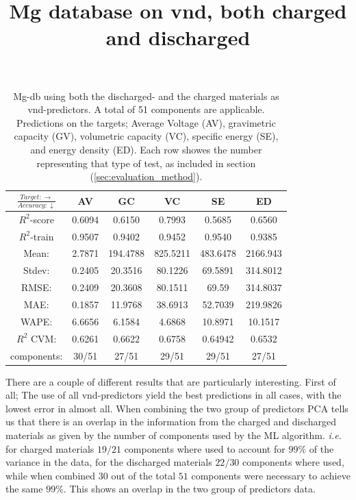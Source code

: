 \begin{table}[h]
\normalsize
\centering
\caption{Mg-db using both the discharged- and the charged materials as vnd-predictors. A total of 51 components are applicable. Predictions on the targets; Average Voltage (AV), gravimetric capacity (GV), volumetric capacity (VC), specific energy (SE), and energy density (ED). Each row showes the number representing that type of test, as included in section (\ref{sec:evaluation_method}).}
\title{Mg database on vnd, both charged and discharged}
\begin{tabular}{|c|c|c|c|c|c|}
	\hline 
	$\frac{Target: \rightarrow}{Accuracy:\downarrow} $ & AV & GC & VC & SE & ED 
	 \\ 
	\hline
	$R^2$-score 	& 0.6094 & 0.6150 & 0.7993 & 0.5685 &  0.6560\\ 
	\hline 
	$R^2$-train 	& 0.9507 & 0.9402 & 0.9452 & 0.9540 &  0.9385 \\ 
	\hline
	Mean: 	 	& 2.7871	&194.4788&825.5211&483.6478& 2166.943\\
	\hline 
	Stdev:	 	& 0.2405	&20.3516	&80.1226 	&69.5891	& 314.8012\\
	\hline 
	RMSE: 		&0.2409& 20.3608 &  80.1511 & 69.59 &314.8037\\ 
	\hline
	MAE: 		& 0.1857 & 11.9768& 38.6913 & 52.7039 & 219.9826 \\ 
	\hline
	WAPE: 		& 6.6656 & 6.1584 & 4.6868  & 10.8971 & 10.1517 \\
	\hline
	$R^2$ CVM: 	&  0.6261 	&  0.6622 	&  0.6758 	&  0.64942 & 0.6532 \\
	\hline
	components: 	& 30/51 	& 27/51 	& 29/51 	 & 29/51 	&27/51 \\
	\hline
\end{tabular}
\label{tab:mg-n-iii}
\end{table}


There are a couple of different results that are particularly interesting. First of all; The use of all vnd-predictors yield the best predictions in all cases, with the lowest error in almost all. When combining the two group of predictors PCA tells us that there is an overlap in the information from the charged and discharged materials as given by the number of components used by the ML algorithm. \textit{i.e.} for charged materials $19/21$ components where used to account for $99\%$ of the variance in the data, for the discharged materials $22/30$ components where used, while when combined $30$ out of the total $51$ components were necessary to achieve the same $99\%$. This shows an overlap in the two group of predictors data.

